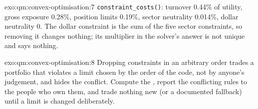 \begin{solution}{exo:qm:convex-optimisation:7}
\texttt{constraint\_costs()}: turnover 0.44\% of utility, gross exposure 0.28\%, position limits 0.19\%, sector neutrality 0.014\%, dollar neutrality 0. The dollar constraint is the sum of the five sector
constraints, so removing it changes nothing; its multiplier in the solver's answer is not unique and says nothing.
\end{solution}

\begin{solution}{exo:qm:convex-optimisation:8}
Dropping constraints in an arbitrary order trades a portfolio that violates a limit chosen by the order of the code, not by anyone's judgement, and hides the conflict. Compute the , report the conflicting rules to the people who own them, and trade nothing new (or a documented fallback) until a limit is changed deliberately.
\end{solution}

